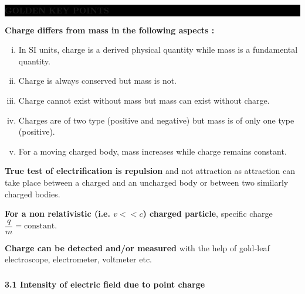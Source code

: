 \begin{frame}[t]
\begin{frame}[t]
\begin{frame}[t]
\begin{frame}[t]
\begin{frame}[t]
\noindent
\begin{center}
    \colorbox{black}{\parbox[c][0.8cm][c]{0.8\textwidth}{\centering\color{white}\large\bfseries GOLDEN KEY POINTS}}
\end{center}

\vspace{1em}

\item<+-> \textbf{Charge differs from mass in the following aspects :}
    \begin{enumerate}[(i)]
        \item<+-> In SI units, charge is a derived physical quantity while mass is a fundamental quantity.
        \item<+-> Charge is always conserved but mass is not.
        \item<+-> Charge cannot exist without mass but mass can exist without charge.
        \item<+-> Charges are of two type (positive and negative) but mass is of only one type (positive).
        \item<+-> For a moving charged body, mass increases while charge remains constant.
    \end{enumerate}

    \vspace{0.7em}

    \item<+-> \textbf{True test of electrification is repulsion} and not attraction as attraction can take place between a charged and an uncharged body or between two similarly charged bodies.

    \vspace{0.7em}

    \item<+-> \textbf{For a non relativistic (i.e. $v << c$) charged particle}, specific charge $\dfrac{q}{m} = \text{constant}$.

    \vspace{0.7em}

    \item<+-> \textbf{Charge can be detected and/or measured} with the help of gold-leaf electroscope, electrometer, voltmeter etc.
\begin{frame}[t]
\frametitle{}

\noindent
\textbf{3.1 Intensity of electric field due to point charge}


\end{frame}
\end{frame}
\end{frame}
\end{frame}
\end{frame}
\end{frame}
